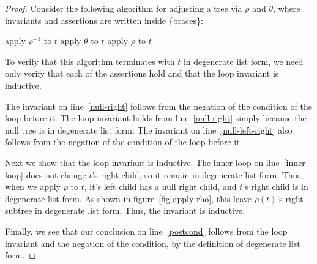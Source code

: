 \documentclass{llncs}
\begin{document}
\begin{proof}
    Consider the following algorithm for adjusting a tree via $\rho$ and $\theta$,
    where invariants and assertions are written inside \{braces\}:
    \begin{algorithm}[H]
      \begin{algorithmic}[1]
            \State apply $\rho^{-1}$ to $t$
          \EndWhile
           \label{null-right}
            \label{inner-loop}
              \State apply $\theta$ to $t$
            \EndWhile
              \label{null-left-right}
            \State apply $\rho$ to $t$ \label{apply-rho}
          \EndWhile
           \label{postcond}
        \EndFunction
      \end{algorithmic}
    \end{algorithm} 


    To verify that this algorithm terminates with $t$ in degenerate list form,
    we need only verify that each of the assertions hold and that the loop
    invariant is inductive.

    The invariant on line~\ref{null-right} follows from the negation of the
    condition of the loop before it.
    The loop invariant holds from line~\ref{null-right} simply because the null
    tree is in degenerate list form.
    The invariant on line~\ref{null-left-right} also follows from the negation of
    the condition of the loop before it.

    Next we show that the loop invariant is inductive.
    The inner loop on line~\ref{inner-loop} does not change $t$'s right child,
    so it remain in degenerate list form.
    Thus, when we apply $\rho$ to $t$, it's left child has a null right child, and
    $t$'s right child is in degenerate list form.
    As shown in figure~\ref{fig-apply-rho}, this leave $\rho(t)$'s right subtree
    in degenerate list form. 
    Thus, the invariant is inductive.

    Finally, we see that our conclusion on line~\ref{postcond} follows from the
    loop invariant and the negation of the condition, by the definition of
    degenerate list form.


\end{proof}
\end{document}
